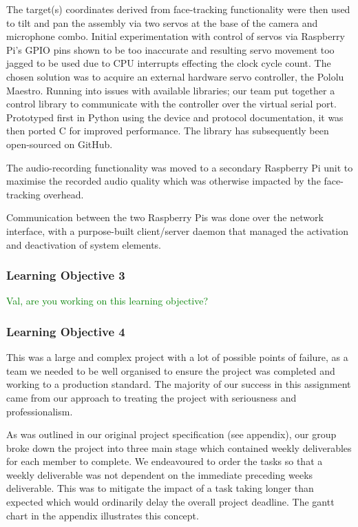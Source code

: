 \documentclass[11pt,a4paper,titlepage]{report}
\begin{document}
The target(s) coordinates derived from face-tracking functionality were then used to tilt and pan the assembly via two servos at the base of the camera and microphone combo. Initial experimentation with control of servos via Raspberry Pi's GPIO pins shown to be too inaccurate and resulting servo movement too jagged to be used due to CPU interrupts effecting the clock cycle count. The chosen solution was to acquire an external hardware servo controller, the Pololu Maestro. Running into issues with available libraries; our team put together a control library to communicate with the controller over the virtual  serial port. Prototyped first in Python using the device and protocol documentation, it was then ported C for improved performance. The library has subsequently been open-sourced on GitHub.

The audio-recording functionality was moved to a secondary Raspberry Pi unit to maximise the recorded audio quality which was otherwise impacted by the face-tracking overhead.

Communication between the two Raspberry Pis was done over the network interface, with a purpose-built client/server daemon that managed the activation and deactivation of system elements.

\subsubsection{Learning Objective 3}

\textcolor{green}{Val, are you working on this learning objective?}

\subsubsection{Learning Objective 4}

This was a large and complex project with a lot of possible points of failure, as a team we needed to be well organised to ensure the project was completed and working to a production standard. The majority of our success in this assignment came from our approach to treating the project with seriousness and professionalism.

As was outlined in our original project specification (see appendix), our group broke down the project into three main stage which contained weekly deliverables for each member to complete. We endeavoured to order the tasks so that a weekly deliverable was not dependent on the immediate preceding weeks deliverable. This was to mitigate the impact of a task taking longer than expected which would ordinarily delay the overall project deadline. The gantt chart in the appendix illustrates this concept.
\end{document}
